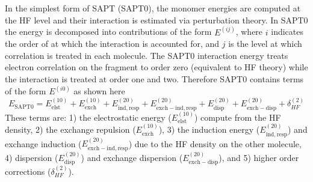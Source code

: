 \documentclass[../Main/notes.tex]{subfiles}
\begin{document}

In the simplest form of SAPT (SAPT0), the monomer energies are computed at the HF level and their interaction is estimated via perturbation theory.
In SAPT0 the energy is decomposed into contributions of the form $E^{(ij)}$, where $i$ indicates the order of at which the interaction is accounted for, and $j$ is the level at which correlation is treated in each molecule.
The SAPT0 interaction energy treats electron correlation on the fragment to order zero (equivalent to HF theory) while the interaction is treated at order one and two. Therefore SAPT0 contains terms of the form $E^{(i0)}$ as shown here
\begin{equation}
E_\mathrm{SAPT0} = E_\mathrm{elst}^{(10)} + E_\mathrm{exch}^{(10)} + E_\mathrm{ind,resp}^{(20)} +
E_\mathrm{exch-ind,resp}^{(20)} + E_\mathrm{disp}^{(20)} + E_\mathrm{exch-disp}^{(20)} + \delta_{HF}^{(2)}
\end{equation}
These terms are: 1) the electrostatic energy ($E_\mathrm{elst}^{(10)} $) compute from the HF density, 2) the exchange repulsion ($E_\mathrm{exch}^{(10)}$), 3) the induction energy ($E_\mathrm{ind,resp}^{(20)} $) and exchange induction ($E_\mathrm{exch-ind,resp}^{(20)}$) due to the HF density on the other molecule, 4) dispersion ($E_\mathrm{disp}^{(20)}$) and exchange dispersion ($E_\mathrm{exch-disp}^{(20)}$), and 5) higher order corrections ($\delta_{HF}^{(2)}$).
\end{document}
